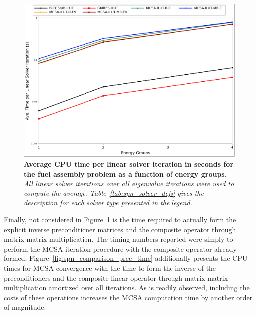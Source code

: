 \begin{figure}[t!]
  \begin{center}
    \includegraphics[width=6in]{chapters/spn_equations/solver_time.pdf}
  \end{center}
  \caption{\textbf{Average CPU time per linear solver iteration in
      seconds for the fuel assembly problem as a function of energy
      groups.}  \textit{All linear solver iterations over all
      eigenvalue iterations were used to compute the
      average. Table~\ref{tab:spn_solver_defs} gives the description
      for each solver type presented in the legend.}}
  \label{fig:spn_comparison_time}
\end{figure}

Finally, not considered in Figure~\ref{fig:spn_comparison_time} is the
time required to actually form the explicit inverse preconditioner
matrices and the composite operator through matrix-matrix
multiplication. The timing numbers reported were simply to perform the
MCSA iteration procedure with the composite operator already
formed. Figure~\ref{fig:spn_comparison_prec_time} additionally
presents the CPU times for MCSA convergence with the time to form the
inverse of the preconditioners and the composite linear operator
through matrix-matrix multiplication amortized over all iterations. As
is readily observed, including the costs of these operations increases
the MCSA computation time by another order of magnitude.

